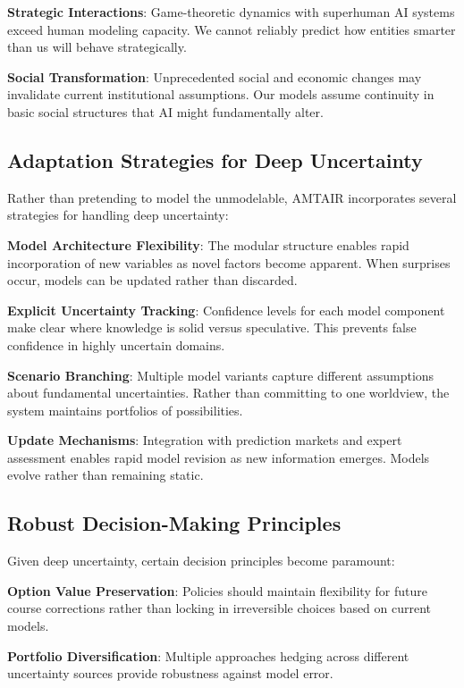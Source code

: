 \documentclass[
  11pt,
  letterpaper,
]{book}
\begin{document}
\textbf{Strategic Interactions}: Game-theoretic dynamics with superhuman
AI systems exceed human modeling capacity. We cannot reliably predict
how entities smarter than us will behave strategically.

\textbf{Social Transformation}: Unprecedented social and economic
changes may invalidate current institutional assumptions. Our models
assume continuity in basic social structures that AI might fundamentally
alter.

\subsection{Adaptation Strategies for Deep
Uncertainty}\label{sec-adaptation-strategies}

Rather than pretending to model the unmodelable, AMTAIR incorporates
several strategies for handling deep uncertainty:

\textbf{Model Architecture Flexibility}: The modular structure enables
rapid incorporation of new variables as novel factors become apparent.
When surprises occur, models can be updated rather than discarded.

\textbf{Explicit Uncertainty Tracking}: Confidence levels for each model
component make clear where knowledge is solid versus speculative. This
prevents false confidence in highly uncertain domains.

\textbf{Scenario Branching}: Multiple model variants capture different
assumptions about fundamental uncertainties. Rather than committing to
one worldview, the system maintains portfolios of possibilities.

\textbf{Update Mechanisms}: Integration with prediction markets and
expert assessment enables rapid model revision as new information
emerges. Models evolve rather than remaining static.

\subsection{Robust Decision-Making
Principles}\label{sec-robust-principles}

Given deep uncertainty, certain decision principles become paramount:

\textbf{Option Value Preservation}: Policies should maintain flexibility
for future course corrections rather than locking in irreversible
choices based on current models.

\textbf{Portfolio Diversification}: Multiple approaches hedging across
different uncertainty sources provide robustness against model error.
\end{document}
